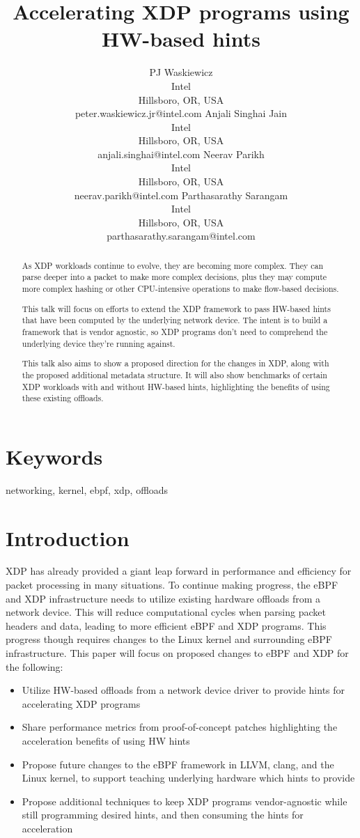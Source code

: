 \documentclass[letterpaper]{article}
\title{Accelerating XDP programs using HW-based hints}
\author{PJ Waskiewicz \\ Intel \\ Hillsboro, OR, USA \\ peter.waskiewicz.jr@intel.com
\And Anjali Singhai Jain \\ Intel \\ Hillsboro, OR, USA \\ anjali.singhai@intel.com
\And Neerav Parikh \\ Intel \\ Hillsboro, OR, USA \\ neerav.parikh@intel.com
\And Parthasarathy Sarangam \\ Intel \\ Hillsboro, OR, USA \\ parthasarathy.sarangam@intel.com
\newline
\newline
}
\begin{document}
 
\maketitle
\begin{abstract}
As XDP workloads continue to evolve, they are becoming more complex.  They can parse deeper into a packet to make more complex decisions, plus they may compute more complex hashing or other CPU-intensive operations to make flow-based decisions.

This talk will focus on efforts to extend the XDP framework to pass HW-based hints that have been computed by the underlying network device.  The intent is to build a framework that is vendor agnostic, so XDP programs don't need to comprehend the underlying device they're running against.

This talk also aims to show a proposed direction for the changes in XDP, along with the proposed additional metadata structure.  It will also show benchmarks of certain XDP workloads with and without HW-based hints, highlighting the benefits of using these existing offloads.
\end{abstract}

\section{Keywords}

networking, kernel, ebpf, xdp, offloads

\section{Introduction}
XDP has already provided a giant leap forward in performance and efficiency for packet processing in many situations. To continue making progress, the eBPF and XDP infrastructure needs to utilize existing hardware offloads from a network device. This will reduce computational cycles when parsing packet headers and data, leading to more efficient eBPF and XDP programs. This progress though requires changes to the Linux kernel and surrounding eBPF infrastructure.
This paper will focus on proposed changes to eBPF and XDP for the following:
\begin{itemize}
\item Utilize HW-based offloads from a network device driver to provide hints for accelerating XDP programs
\item Share performance metrics from proof-of-concept patches highlighting the acceleration benefits of using HW hints
\item Propose future changes to the eBPF framework in LLVM, clang, and the Linux kernel, to support teaching underlying hardware which hints to provide
\item Propose additional techniques to keep XDP programs vendor-agnostic while still programming desired hints, and then consuming the hints for acceleration
\end{itemize}
\end{document}

